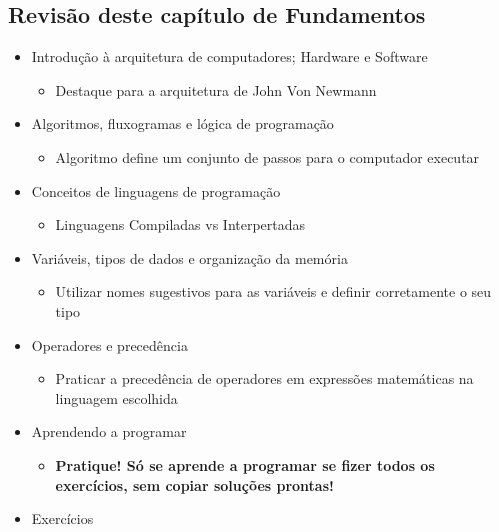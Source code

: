 \documentclass[12pt,a4paper]{article}
\providecommand{\tightlist}{%
      \setlength{\itemsep}{0pt}\setlength{\parskip}{0pt}}
\begin{document}
    \hypertarget{revisuxe3o-deste-capuxedtulo-de-fundamentos}{%
\subsection{Revisão deste capítulo de
Fundamentos}\label{revisuxe3o-deste-capuxedtulo-de-fundamentos}}

\begin{itemize}
\tightlist
\item
  Introdução à arquitetura de computadores; Hardware e Software

  \begin{itemize}
  \tightlist
  \item
    Destaque para a arquitetura de John Von Newmann
  \end{itemize}
\item
  Algoritmos, fluxogramas e lógica de programação

  \begin{itemize}
  \tightlist
  \item
    Algoritmo define um conjunto de passos para o computador executar
  \end{itemize}
\item
  Conceitos de linguagens de programação

  \begin{itemize}
  \tightlist
  \item
    Linguagens Compiladas vs Interpertadas
  \end{itemize}
\item
  Variáveis, tipos de dados e organização da memória

  \begin{itemize}
  \tightlist
  \item
    Utilizar nomes sugestivos para as variáveis e definir corretamente o
    seu tipo
  \end{itemize}
\item
  Operadores e precedência

  \begin{itemize}
  \tightlist
  \item
    Praticar a precedência de operadores em expressões matemáticas na
    linguagem escolhida
  \end{itemize}
\item
  Aprendendo a programar

  \begin{itemize}
  \tightlist
  \item
    \textbf{Pratique! Só se aprende a programar se fizer todos os
    exercícios, sem copiar soluções prontas!}
  \end{itemize}
\item
  Exercícios
\end{itemize}
\end{document}
